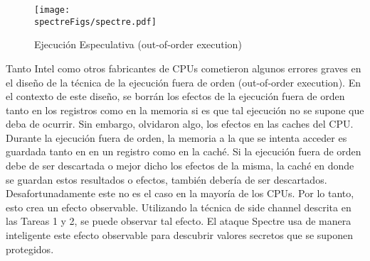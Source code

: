 \begin{figure}[htb]
\centering
\texttt{[image: \\spectreFigs/spectre.pdf]}
\caption{Ejecución Especulativa (out-of-order execution)}
\label{spectre:fig:spectre}
\end{figure}

Tanto Intel como otros fabricantes de CPUs cometieron algunos errores graves en el diseño de la técnica de la ejecución fuera de orden (out-of-order execution).
En el contexto de este diseño, se borrán los efectos de la ejecución fuera de orden tanto en los registros como en la memoria si es que tal ejecución no se supone que deba de ocurrir. Sin embargo, olvidaron algo, los efectos en las caches del CPU.
Durante la ejecución fuera de orden, la memoria a la que se intenta acceder es guardada tanto en en un registro como en la caché. Si la ejecución fuera de orden debe de ser descartada o mejor dicho los efectos de la misma, la caché en donde se guardan estos resultados o efectos, también debería de ser descartados. Desafortunadamente este no es el caso en la mayoría de los CPUs.
Por lo tanto, esto crea un efecto observable.
Utilizando la técnica de side channel descrita en las Tareas 1 y 2,
se puede observar tal efecto. El ataque Spectre usa de manera inteligente este
efecto observable para descubrir valores secretos que se suponen protegidos.





